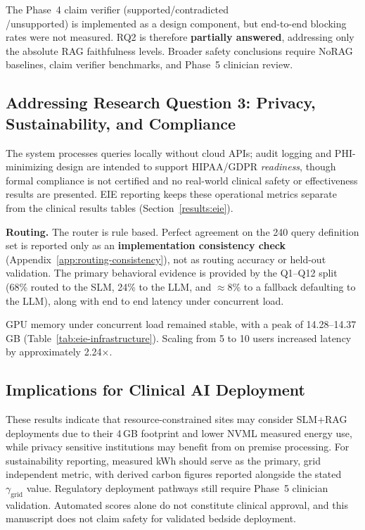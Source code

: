The Phase~4 claim verifier (supported/contradicted \\ /unsupported) is implemented as a design component, but end-to-end blocking rates were not measured. RQ2 is therefore \textbf{partially answered}, addressing only the absolute RAG faithfulness levels. Broader safety conclusions require NoRAG baselines, claim verifier benchmarks, and Phase~5 clinician review.

\subsection{Addressing Research Question 3: Privacy, Sustainability, and Compliance}

The system processes queries locally without cloud APIs; audit logging and PHI-minimizing design are intended to support HIPAA/GDPR \emph{readiness}, though formal compliance is not certified and no real-world clinical safety or effectiveness results are presented. EIE reporting keeps these operational metrics separate from the clinical results tables (Section~\ref{results:eie}).

\textbf{Routing.}
The router is rule based. Perfect agreement on the 240 query definition set is reported only as an \textbf{implementation consistency check} (Appendix~\ref{app:routing-consistency}), not as routing accuracy or held-out validation. The primary behavioral evidence is provided by the Q1--Q12 split (68\% routed to the SLM, 24\% to the LLM, and $\approx$8\% to a fallback defaulting to the LLM), along with end to end latency under concurrent load.

GPU memory under concurrent load remained stable, with a peak of 14.28--14.37\,GB (Table~\ref{tab:eie-infrastructure}). Scaling from 5 to 10 users increased latency by approximately 2.24$\times$.

\subsection{Implications for Clinical AI Deployment}

These results indicate that resource-constrained sites may consider SLM+RAG deployments due to their 4\,GB footprint and lower NVML measured energy use, while privacy sensitive institutions may benefit from on premise processing. For sustainability reporting, measured kWh should serve as the primary, grid independent metric, with derived carbon figures reported alongside the stated $\gamma_{\mathrm{grid}}$ value. Regulatory deployment pathways still require Phase~5 clinician validation. Automated scores alone do not constitute clinical approval, and this manuscript does not claim safety for validated bedside deployment.

